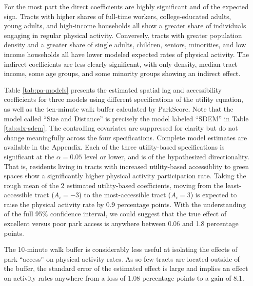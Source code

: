 \documentclass[shortAfour,sageh.bst]{sagej}
\begin{document}
For the most part the direct coefficients are highly significant and of
the expected sign. Tracts with higher shares of full-time workers,
college-educated adults, young adults, and high-income households all
show a greater share of individuals engaging in regular physical
activity. Conversely, tracts with greater population density and a
greater share of single adults, children, seniors, minorities, and low
income households all have lower modeled expected rates of physical
activity. The indirect coefficients are less clearly significant, with
only density, median tract income, some age groups, and some minority
groups showing an indirect effect.

Table \ref{tab:pa-models} presents the estimated spatial lag and
accessibility coefficients for three models using different
specifications of the utility equation, as well as the ten-minute walk
buffer calculated by ParkScore. Note that the model called ``Size and
Distance'' is precisely the model labeled ``SDEM'' in Table
\ref{tab:slx-sdem}. The controlling covariates are suppressed for
clarity but do not change meaningfully across the four specifications.
Complete model estimates are available in the Appendix. Each of the
three utility-based specifications is significant at the
\(\alpha = 0.05\) level or lower, and is of the hypothesized
directionality. That is, residents living in tracts with increased
utility-based accessiblity to green spaces show a significantly higher
physical activity participation rate. Taking the rough mean of the 2
estimated utility-based coefficients, moving from the least-accessible
tract (\(A_i = -3\)) to the most-accessible tract (\(A_i = 3\)) is
expected to raise the physical activity rate by 0.9 percentage points.
With the understanding of the full 95\% confidence interval, we could
suggest that the true effect of excellent versus poor park access is
anywhere between 0.06 and 1.8 percentage points.

The 10-minute walk buffer is considerably less useful at isolating the
effects of park ``access'' on physical activity rates. As so few tracts
are located outside of the buffer, the standard error of the estimated
effect is large and implies an effect on activity rates anywhere from a
loss of 1.08 percentage points to a gain of 8.1.
\end{document}
